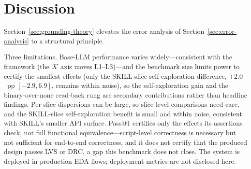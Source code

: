 \section{Discussion}
\label{sec:discussion}

Section~\ref{sec:grounding-theory} elevates the error analysis of Section~\ref{sec:error-analysis} to a structural principle.

Three limitations. Base-LLM performance varies widely---consistent with the framework (the $\mathcal{K}$ axis moves L1--L3)---and the benchmark size limits power to certify the smallest effects (only the SKILL-slice self-exploration difference, $+2.0$~pp $[-2.9,6.9]$, remains within noise), so the self-exploration gain and the binary-over-none read-back rung are secondary contributions rather than headline findings. Per-slice dispersions can be large, so slice-level comparisons need care, and the SKILL-slice self-exploration benefit is small and within noise, consistent with SKILL's smaller API surface. Pass@1 certifies only the effects its assertions check, not full functional equivalence---script-level correctness is necessary but not sufficient for end-to-end correctness, and it does not certify that the produced design passes LVS or DRC, a gap this benchmark does not close. The system is deployed in production EDA flows; deployment metrics are not disclosed here.
